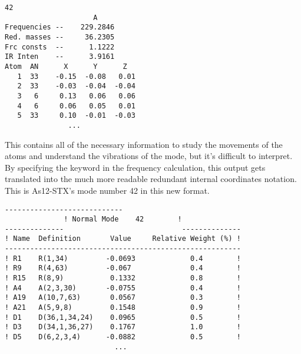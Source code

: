 \begin{lstlisting}[label=normal-mode-output, style=kaolstplain]
                    42
                     A
Frequencies --    229.2846
Red. masses --     36.2305
Frc consts  --      1.1222
IR Inten    --      3.9161
Atom  AN      X      Y      Z
   1  33    -0.15  -0.08   0.01
   2  33    -0.03  -0.04  -0.04
   3   6     0.13   0.06   0.06
   4   6     0.06   0.05   0.01
   5  33     0.10  -0.01  -0.03
               ...
\end{lstlisting}

This contains all of the necessary information to study the movements of the atoms and understand the vibrations of the mode, but it's difficult to interpret.
By specifying the keyword  in the frequency calculation, this output gets translated into the much more readable redundant internal coordinates notation.
This is As12-STX's mode number 42 in this new format.

\begin{lstlisting}[label=intmodes-output, style=kaolstplain]
              ----------------------------
              ! Normal Mode    42        !
--------------                            --------------
! Name  Definition       Value     Relative Weight (%) !
--------------------------------------------------------
! R1    R(1,34)         -0.0693             0.4        !
! R9    R(4,63)         -0.067              0.4        !
! R15   R(8,9)           0.1332             0.8        !
! A4    A(2,3,30)       -0.0755             0.4        !
! A19   A(10,7,63)       0.0567             0.3        !
! A21   A(5,9,8)         0.1548             0.9        !
! D1    D(36,1,34,24)    0.0965             0.5        !
! D3    D(34,1,36,27)    0.1767             1.0        !
! D5    D(6,2,3,4)      -0.0882             0.5        !
                          ...
\end{lstlisting}


